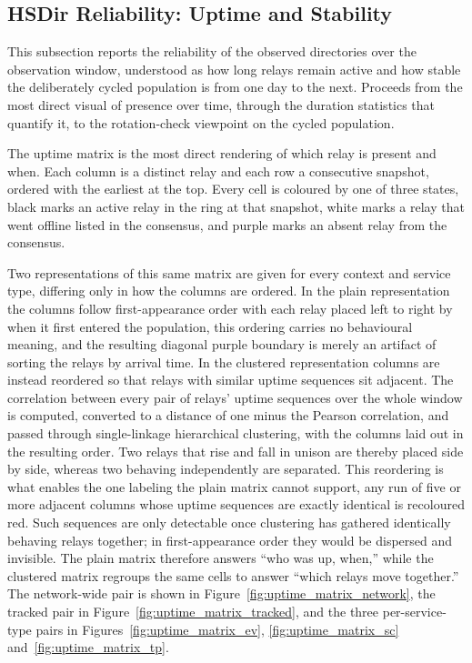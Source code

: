 \documentclass[conference]{IEEEtran}
\begin{document}
\subsection{HSDir Reliability: Uptime and Stability}
 
This subsection reports the reliability of the observed directories over the observation window, understood as how
long relays remain active and how stable the deliberately cycled population is from one day to the next. Proceeds from the most direct
visual of presence over time, through the duration statistics that quantify it, to the rotation-check viewpoint on the cycled population.
 
The uptime matrix is the most direct rendering of which relay is present and when. Each column is a distinct relay and each row a consecutive snapshot, ordered
with the earliest at the top. Every cell is coloured by one of three states, black marks an active relay in the ring at that snapshot, white marks a 
relay that went offline listed in the consensus, and purple marks an absent relay from the consensus.
 
Two representations of this same matrix are given for every context and service type, differing only in how the columns are ordered. In the plain representation
the columns follow first-appearance order with each relay placed left to right by when it first entered the population, this ordering carries no 
behavioural meaning, and the resulting diagonal purple boundary is merely an artifact of sorting the relays by arrival time. In the clustered representation 
columns are instead reordered so that relays with similar uptime sequences sit adjacent. The correlation between every pair of relays' uptime 
sequences over the whole window is computed, converted to a distance of one minus the Pearson correlation, and passed through single-linkage 
hierarchical clustering, with the columns laid out in the resulting order. Two relays that rise and fall in unison are thereby placed side by 
side, whereas two behaving independently are separated. This reordering is what enables the one labeling the plain matrix cannot support, any run of 
five or more adjacent columns whose uptime sequences are exactly identical is recoloured red. Such sequences are only detectable once clustering has 
gathered identically behaving relays together; in first-appearance order they would be dispersed and invisible. The plain matrix therefore answers ``who 
was up, when,'' while the clustered matrix regroups the same cells to answer ``which relays move together.'' The network-wide pair is shown in 
Figure~\ref{fig:uptime_matrix_network}, the tracked pair in Figure~\ref{fig:uptime_matrix_tracked}, and the three per-service-type pairs in 
Figures~\ref{fig:uptime_matrix_ev}, \ref{fig:uptime_matrix_sc} and~\ref{fig:uptime_matrix_tp}.
 
\end{document}
